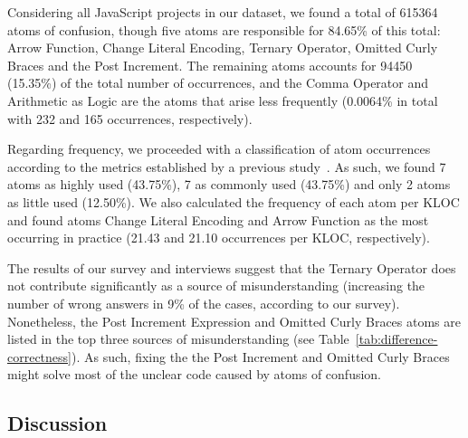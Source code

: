 Considering all JavaScript projects in our dataset, we found 
a total of \num{615364} atoms of confusion, though five atoms are responsible for 84.65\% of this total: Arrow Function, Change Literal Encoding, Ternary Operator, Omitted Curly Braces and the Post Increment. The remaining atoms accounts for \num{94450} (15.35\%) of the total number of occurrences, and the Comma Operator and Arithmetic as Logic are the atoms that arise less frequently (0.0064\% in total with 232 and 165 occurrences, respectively). 

Regarding frequency, we proceeded with a classification of atom occurrences according to the metrics established by a previous study~\cite{DBLP:journals/ese/MedeirosLAAKRG19}. As such, we found 7 atoms as highly used (43.75\%), 7 as commonly used (43.75\%) and only 2 atoms as little used (12.50\%). We also calculated the frequency of each atom per KLOC and found atoms Change Literal Encoding and Arrow Function as the most occurring in practice (21.43 and 21.10 occurrences per KLOC, respectively).

The results of our survey and interviews suggest that the Ternary Operator does not contribute significantly as a source of misunderstanding (increasing the number of wrong answers in 9\% of the cases, according to our survey). Nonetheless, the Post Increment Expression and Omitted Curly Braces atoms are listed in the top three sources of misunderstanding 
(see Table~\ref{tab:difference-correctness}). As such, fixing the the Post Increment and Omitted Curly Braces might solve most of the unclear code caused by atoms of confusion. 




\subsection{Discussion}
\label{sec:discussion}
